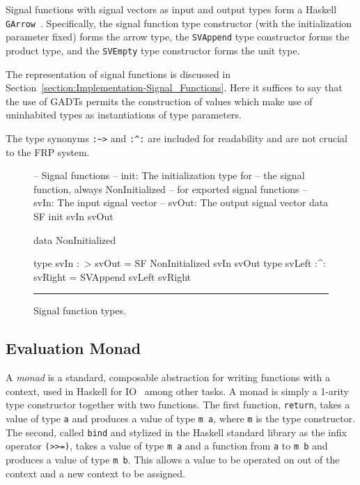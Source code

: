 Signal functions with signal vectors as input and output types form a
Haskell {\tt GArrow}~\cite{Megacz2011}. Specifically, the signal function
type constructor (with the initialization parameter fixed) forms the arrow
type, the {\tt SVAppend} type constructor forms the product type, and the
{\tt SVEmpty} type constructor forms the unit type.

The representation of signal functions is discussed in
Section~\ref{section:Implementation-Signal_Functions}. Here it suffices to say
that the use of GADTs permits the construction of values which make use of
uninhabited types as instantiations of type parameters.

The type synonyms {\tt :\textasciitilde>} and {\tt :\textasciicircum:} are included for readability and are
not crucial to the FRP system.

\begin{figure}
\begin{code}
-- Signal functions
-- init: The initialization type for 
-- the signal function, always NonInitialized
-- for exported signal functions
-- svIn: The input signal vector
-- svOut: The output signal vector
data SF init svIn svOut

data NonInitialized

type svIn :~> svOut = SF NonInitialized svIn svOut
type svLeft :^: svRight = SVAppend svLeft svRight
\end{code}
\hrule
\caption{Signal function types.}
\label{figure:signal_function_types}
\end{figure}

\subsection{Evaluation Monad}
\label{section:System_Design_and_Interface-Types-Evaluation_Monad}

A {\em monad} is a standard, composable abstraction for writing functions with
a context, used in Haskell for IO~\cite{PeytonJones1993,PeytonJones2001} among
other tasks. A monad is simply a 1-arity type constructor together with two
functions. The first function, {\tt return}, takes a value of type {\tt a} and
produces a value of type {\tt m a}, where {\tt m} is the type constructor. The
second, called {\tt bind} and stylized in the Haskell standard library as the
infix operator {\tt (>>=)}, takes a value of type {\tt m a} and a function
from {\tt a} to {\tt m b} and produces a value of type {\tt m b}. This allows
a value to be operated on out of the context and a new context to be assigned.


